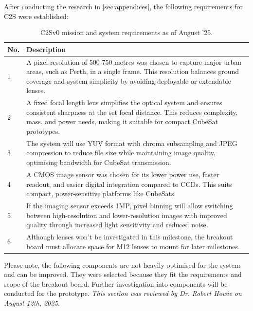 After conducting the research in \autoref{sec:appendices}, the following requirements for C2S were established:

\begin{table}[H]
    \centering
    \begin{tabular}{|l|p{10cm}|}
    \hline
    \textbf{No.} & \textbf{Description} \\
    \hline
    1 & A pixel resolution of 500-750 metres was chosen to capture major urban areas, such as Perth, in a single frame. This resolution balances ground coverage and system simplicity by avoiding deployable or extendable lenses. \\
    \hline
    2 & A fixed focal length lens simplifies the optical system and ensures consistent sharpness at the set focal distance. This reduces complexity, mass, and power needs, making it suitable for compact CubeSat prototypes. \\
    \hline
    3 & The system will use YUV format with chroma subsampling and JPEG compression to reduce file size while maintaining image quality, optimising bandwidth for CubeSat transmission. \\
    \hline
    4 & A CMOS image sensor was chosen for its lower power use, faster readout, and easier digital integration compared to CCDs. This suits compact, power-sensitive platforms like CubeSats. \\
    \hline
    5 & If the imaging sensor exceeds 1MP, pixel binning will allow switching between high-resolution and lower-resolution images with improved quality through increased light sensitivity and reduced noise. \\
    \hline
    6 & Although lenses won't be investigated in this milestone, the breakout board must allocate space for M12 lenses to mount for later milestones. \\
    \hline
    \end{tabular}
    \caption{C2Sv0 mission and system requirements as of August '25.}
    \label{tab:v0-requirements}
\end{table}

Please note, the following components are not heavily optimised for the system and can be improved. They were selected because they fit the requirements and scope of the breakout board.
Further investigation into components will be conducted for the prototype.
\nl
\textit{This section was reviewed by Dr. Robert Howie on August 12th, 2025.}

